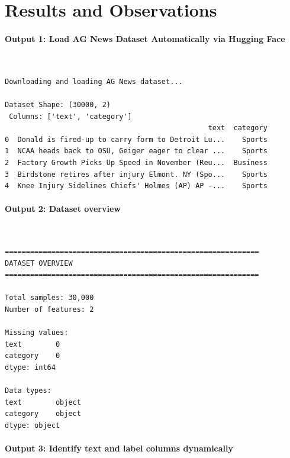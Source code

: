 \documentclass[12pt,a4paper,oneside]{report}
\begin{document}
\section{Results and Observations}
\paragraph{Output 1: Load AG News Dataset Automatically via Hugging Face}\mbox{}\\[-1ex]
\begin{Verbatim}[commandchars=\\\{\},breaklines=true,breakanywhere=true,fontsize=\scriptsize,frame=leftline,framesep=2mm,rulecolor=\color{gray}]
 Downloading and loading AG News dataset...

Dataset Shape: (30000, 2)
 Columns: ['text', 'category']
                                                text  category
0  Donald is fired-up to carry form to Detroit Lu...    Sports
1  NCAA heads back to OSU, Geiger eager to clear ...    Sports
2  Factory Growth Picks Up Speed in November (Reu...  Business
3  Birdstone retires after injury Elmont. NY (Spo...    Sports
4  Knee Injury Sidelines Chiefs' Holmes (AP) AP -...    Sports
\end{Verbatim}
\paragraph{Output 2: Dataset overview}\mbox{}\\[-1ex]
\begin{Verbatim}[commandchars=\\\{\},breaklines=true,breakanywhere=true,fontsize=\scriptsize,frame=leftline,framesep=2mm,rulecolor=\color{gray}]
============================================================
DATASET OVERVIEW
============================================================

Total samples: 30,000
Number of features: 2

Missing values:
text        0
category    0
dtype: int64

Data types:
text        object
category    object
dtype: object
\end{Verbatim}
\paragraph{Output 3: Identify text and label columns dynamically}\mbox{}\\[-1ex]
\end{document}
